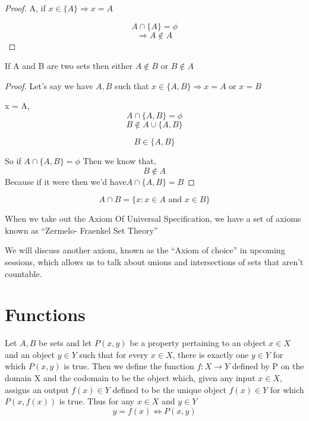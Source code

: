 \documentclass[11pt]{report}
\begin{document}
\begin{enumerate}
\begin{proof}
		      A, if $x \in \{A\} \Rightarrow x = A$

		      \[
			      A \cap \{A\} = \phi
		      \]
		      \[
			      \Rightarrow A \notin A
		      \]
	      \end{proof}
	      \begin{prop}
		      If A and B are two sets then either $A \notin B$ or $B \notin A$
	      \end{prop}
	      \begin{proof}
		      Let's say we have $A,B$ such that $x \in \{A,B\} \Rightarrow x = A$ or $x = B$

		      x = A,
		      \[
			      A \cap \{A,B\} = \phi
		      \]
		      \[
			      B \notin A \cup \{A,B\}
		      \]


		      \[
			      B \in \{A,B\}
		      \]

		      So if $A \cap \{A,B\} = \phi$
		      Then we know that,
		      \[
			      B \notin A
		      \]
		      Because if it were then we'd have$A \cap \{A,B\} = B$
	      \end{proof}

\end{enumerate}
\begin{definition}
	$$A \cap B = \{x: x \in A \text{ and } x \in B \}$$
\end{definition}

When we take out the Axiom Of Universal Specification, we have a set of axioms known as ``Zermelo- Fraenkel Set Theory''

We will discuss another axiom, known as the ``Axiom of choice'' in upcoming sessions, which allows us to talk about unions and intersections of sets that aren't countable.
\section{Functions}

\begin{definition}[Functions]
	Let $A,B$ be sets and let $P(x,y)$ be a property pertaining to an object $x \in X$ and an object $y \in Y$ such that for every $x \in X$, there is exactly one $y \in Y$ for which $P(x,y)$ is true. Then we define the function $f:X  \rightarrow Y$ defined by P on the domain X and the codomain to be the object which, given any input $x \in X$, assigns an output $f(x) \in Y$ defined to be the unique object $f(x) \in Y$ for which $P(x, f(x))$ is true. Thus for any $x \in X$ and $y \in Y$
	\[
		y = f(x) \Leftrightarrow P(x,y)
	\]
\end{definition}
\end{document}
